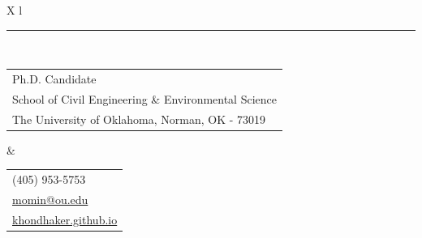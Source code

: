 \documentclass[a4paper,11pt]{article}
\newcommand{\headerfontvi}{\fontfamily{cmss}\selectfont} %
\begin{document}
\headerfontvi
\noindent
\begin{tabularx}{\textwidth}{X l}
     \\

    \rule[0pt]{\textwidth}{0.5pt} \\
    [6pt]
    \begin{tabular}[t]{@{}l@{}}
        Ph.D. Candidate \\[2pt]
        School of Civil Engineering \& Environmental Science \\[2pt]
        The University of Oklahoma, Norman, OK - 73019
    \end{tabular}
    &
    \begin{tabular}[t]{@{}l@{}}
        \faPhone \hspace{4pt} (405) 953-5753 \\[3pt]
        \faEnvelope \hspace{4pt} \href{mailto:momin@ou.edu}{momin@ou.edu} \\[3pt]
        \faGlobe \hspace{4pt} \href{https://khondhaker.github.io/}{khondhaker.github.io}
        \end{tabular}
\end{tabularx}

\end{document}
